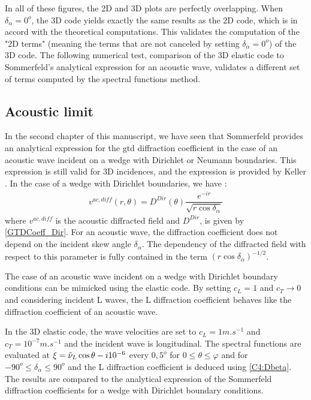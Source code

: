 In all of these figures, the 2D and 3D plots are perfectly overlapping. When $\delta_{\alpha}=0^o$, the 3D code yields exactly the same results as the 2D code, which is in accord with the theoretical computations. This validates the computation of the "2D terms" (meaning the terms that are not canceled by setting $\delta_{\alpha}=0^o$) of the 3D code. The following numerical test, comparison of the 3D elastic code to Sommerfeld's analytical expression for an acoustic wave, validates a different set of terms computed by the spectral functions method.

\subsection{Acoustic limit}
In the second chapter of this manuscript, we have seen that Sommerfeld \cite{Sommerfeld} provides an analytical expression for the \acrshort{gtd} diffraction coefficient in the case of an acoustic wave incident on a wedge with Dirichlet or Neumann boundaries. This expression is still valid for 3D incidences, and the expression is provided by Keller \cite{GTD}. In the case of a wedge with Dirichlet boundaries, we have :
\begin{equation}
\begin{split}
v^{ac,diff}(r,\theta)=D^{Dir}(\theta)\dfrac{e^{-ir}}{\sqrt{r\cos\delta_{\alpha}}}
\end{split}
\end{equation}
where $v^{ac,diff}$ is the acoustic diffracted field and $D^{Dir}$, is given by \eqref{GTDCoeff_Dir}. For an acoustic wave, the diffraction coefficient does not depend on the incident skew angle $\delta_{\alpha}$. The dependency of the diffracted field with respect to this parameter is fully contained in the term $(r\cos\delta_{\alpha})^{-1/2}$.

The case of an acoustic wave incident on a wedge with Dirichlet boundary conditions can be mimicked using the elastic code. By setting $c_L=1$ and $c_T \rightarrow 0$ and considering incident L waves, the L diffraction coefficient behaves like the diffraction coefficient of an acoustic wave. 

In the 3D elastic code, the wave velocities are set to $c_L=1 m.s^{-1}$ and $c_T=10^{-7} m.s^{-1}$ and the incident wave is longitudinal. The spectral functions are evaluated at $\xi=\tilde{\nu}_L\cos\theta -i10^{-6}$ every $0,5^o$ for $0\leq\theta\leq \varphi$ and for $-90^o\leq \delta_{\alpha} \leq 90^o$ and the L diffraction coefficient is deduced using \eqref{C4:Dbeta}. The results are compared to the analytical expression of the Sommerfeld diffraction coefficients for a wedge with Dirichlet boundary conditions.

